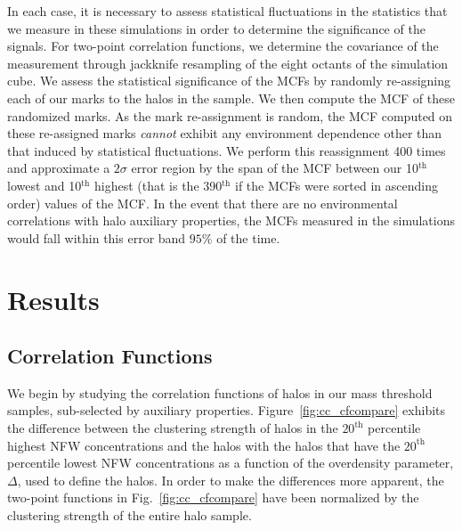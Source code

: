 \documentclass[usenatbib]{mnras}
\begin{document}
In each case, it is necessary to assess statistical fluctuations in the statistics that we measure in these simulations in
order to determine the significance of the signals. For two-point correlation functions, we determine the
covariance of the measurement through jackknife resampling of the eight octants of the simulation cube. We assess
the statistical significance of the MCFs by randomly re-assigning each of our marks to the halos in the sample. 
We then compute the MCF of these randomized marks. As the mark re-assignment is random, 
the MCF computed on these re-assigned marks {\em cannot} exhibit any 
environment dependence other than that induced by statistical fluctuations. 
We perform this reassignment 400 times and approximate a $2\sigma$ error region by 
the span of the MCF between our 10$^\mathrm{th}$ lowest and 10$^\mathrm{th}$ highest (that is the
390$^\mathrm{th}$ if the MCFs were sorted in ascending order) values of the MCF. In the event that there are no
environmental correlations with halo auxiliary properties, the MCFs measured in the simulations would fall within
this error band $95\%$ of the time. 


\section[]{Results}
\label{section:results}


\subsection{Correlation Functions}
\label{sub:cfresults}


We begin by studying the correlation functions of halos in our mass threshold samples, sub-selected by auxiliary
properties. Figure~\ref{fig:cc_cfcompare} exhibits the difference between the clustering strength of halos in the
$20^{\mathrm{th}}$ percentile highest NFW concentrations and the halos with the halos that have the
$20^{\mathrm{th}}$ percentile lowest NFW concentrations as a function of the overdensity parameter, $\Delta$, used to
define the halos. In order to make the differences more apparent, the two-point functions in 
Fig.~\ref{fig:cc_cfcompare} have been normalized by the clustering strength of the entire halo sample. 
\end{document}
